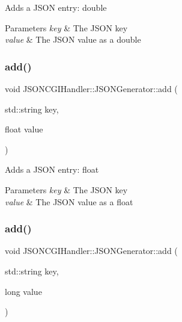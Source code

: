 Adds a J\+S\+ON entry\+: double 
\begin{DoxyParams}{Parameters}
{\em key} & The J\+S\+ON key \\
\hline
{\em value} & The J\+S\+ON value as a double \\
\hline
\end{DoxyParams}
\mbox{\label{classJSONCGIHandler_1_1JSONGenerator_a2192849b22341653a138bb63da6c6c9a}} 
\subsubsection{\texorpdfstring{add()}{add()}\hspace{0.1cm}{\footnotesize\ttfamily [3/5]}}
{\footnotesize\ttfamily void J\+S\+O\+N\+C\+G\+I\+Handler\+::\+J\+S\+O\+N\+Generator\+::add (\begin{DoxyParamCaption}\item[{std\+::string}]{key,  }\item[{float}]{value }\end{DoxyParamCaption})\hspace{0.3cm}{\ttfamily [inline]}}

Adds a J\+S\+ON entry\+: float 
\begin{DoxyParams}{Parameters}
{\em key} & The J\+S\+ON key \\
\hline
{\em value} & The J\+S\+ON value as a float \\
\hline
\end{DoxyParams}
\mbox{\label{classJSONCGIHandler_1_1JSONGenerator_afc3e9374b0e49ca1f701bd22bbd4cd92}} 
\subsubsection{\texorpdfstring{add()}{add()}\hspace{0.1cm}{\footnotesize\ttfamily [4/5]}}
{\footnotesize\ttfamily void J\+S\+O\+N\+C\+G\+I\+Handler\+::\+J\+S\+O\+N\+Generator\+::add (\begin{DoxyParamCaption}\item[{std\+::string}]{key,  }\item[{long}]{value }\end{DoxyParamCaption})\hspace{0.3cm}{\ttfamily [inline]}}

